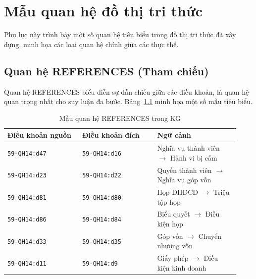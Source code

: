 \chapter{Mẫu quan hệ đồ thị tri thức}
\label{app:quan-he-do-thi}

Phụ lục này trình bày một số quan hệ tiêu biểu trong đồ thị tri thức đã xây dựng,
minh họa các loại quan hệ chính giữa các thực thể.

\section{Quan hệ REFERENCES (Tham chiếu)}
\label{sec:app-references}

Quan hệ REFERENCES biểu diễn sự dẫn chiếu giữa các điều khoản, là quan hệ quan
trọng nhất cho suy luận đa bước. Bảng~\ref{tab:rel-references} minh họa một số mẫu
tiêu biểu.

\begin{table}[htbp]
  \centering
  \caption{Mẫu quan hệ REFERENCES trong KG}
  \label{tab:rel-references}
  \begin{tabular}{p{0.30\linewidth} p{0.30\linewidth} p{0.33\linewidth}}
    \toprule
    \textbf{Điều khoản nguồn} & \textbf{Điều khoản đích} & \textbf{Ngữ cảnh} \\
    \midrule
    \texttt{59-QH14:d47} & \texttt{59-QH14:d16} &
    Nghĩa vụ thành viên $\to$ Hành vi bị cấm \\[4pt]

    \texttt{59-QH14:d23} & \texttt{59-QH14:d22} &
    Quyền thành viên $\to$ Nghĩa vụ góp vốn \\[4pt]

    \texttt{59-QH14:d81} & \texttt{59-QH14:d80} &
    Họp ĐHĐCĐ $\to$ Triệu tập họp \\[4pt]

    \texttt{59-QH14:d86} & \texttt{59-QH14:d84} &
    Biểu quyết $\to$ Điều kiện họp \\[4pt]

    \texttt{59-QH14:d33} & \texttt{59-QH14:d35} &
    Góp vốn $\to$ Chuyển nhượng vốn \\[4pt]

    \texttt{59-QH14:d11} & \texttt{59-QH14:d9} &
    Giấy phép $\to$ Điều kiện kinh doanh \\
    \bottomrule
  \end{tabular}
\end{table}

